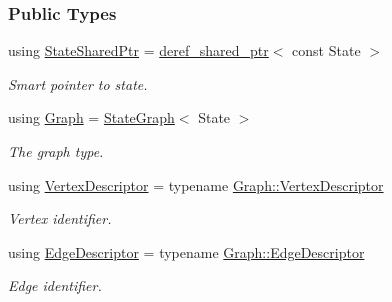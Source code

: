\subsubsection*{Public Types}
\begin{DoxyCompactItemize}
\item 
using \hyperlink{structCurrentStyles_a0cb52515f7e35aedfa2917f2fd2bc199}{State\+Shared\+Ptr} = \hyperlink{classderef__shared__ptr}{deref\+\_\+shared\+\_\+ptr}$<$ const State $>$\hypertarget{structCurrentStyles_a0cb52515f7e35aedfa2917f2fd2bc199}{}\label{structCurrentStyles_a0cb52515f7e35aedfa2917f2fd2bc199}

\begin{DoxyCompactList}\small\item\em Smart pointer to state. \end{DoxyCompactList}\item 
using \hyperlink{structCurrentStyles_af03ea3e1836532dbd394a7ccfdea1e4c}{Graph} = \hyperlink{structStateGraph}{State\+Graph}$<$ State $>$\hypertarget{structCurrentStyles_af03ea3e1836532dbd394a7ccfdea1e4c}{}\label{structCurrentStyles_af03ea3e1836532dbd394a7ccfdea1e4c}

\begin{DoxyCompactList}\small\item\em The graph type. \end{DoxyCompactList}\item 
using \hyperlink{structCurrentStyles_a64e3b180d16f14caf4110487114c4b8e}{Vertex\+Descriptor} = typename \hyperlink{structStateGraph_a95d7ea26b0d0d07d3488068a8e9be53c}{Graph\+::\+Vertex\+Descriptor}\hypertarget{structCurrentStyles_a64e3b180d16f14caf4110487114c4b8e}{}\label{structCurrentStyles_a64e3b180d16f14caf4110487114c4b8e}

\begin{DoxyCompactList}\small\item\em Vertex identifier. \end{DoxyCompactList}\item 
using \hyperlink{structCurrentStyles_a95e023cdab7305f1870fde9411602cf5}{Edge\+Descriptor} = typename \hyperlink{structStateGraph_a419a555605bf486301b84dd6055d81f2}{Graph\+::\+Edge\+Descriptor}\hypertarget{structCurrentStyles_a95e023cdab7305f1870fde9411602cf5}{}\label{structCurrentStyles_a95e023cdab7305f1870fde9411602cf5}

\begin{DoxyCompactList}\small\item\em Edge identifier. \end{DoxyCompactList}\end{DoxyCompactItemize}
